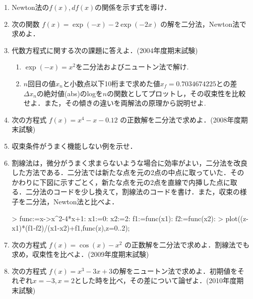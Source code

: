 \begin{enumerate}
\item Newton法の$f(x), df(x)$の関係を示す式を導け．
\item 次の関数 $f(x) = \exp(-x)-2\exp(-2x)$ の解を二分法，Newton法で求めよ．
\item 代数方程式に関する次の課題に答えよ．(2004年度期末試験)
\begin{enumerate}
\item $\exp(-x) = x^2$を二分法およびニュートン法で解け.
\item $n$回目の値$x_n$と小数点以下10桁まで求めた値$x_f=0.7034674225$との差$\Delta x_n$の絶対値(abs)のlogを$n$の関数としてプロットし，その収束性を比較せよ．また，その傾きの違いを両解法の原理から説明せよ.
\end{enumerate}
\item 次の方程式 $f(x) = x^4-x-0.12$ の正数解を二分法で求めよ．(2008年度期末試験)
\item 収束条件がうまく機能しない例を示せ．
\item 割線法は，微分がうまく求まらないような場合に効率がよい，二分法を改良した方法である．二分法では新たな点を元の2点の中点に取っていた．そのかわりに下図に示すごとく，新たな点を元の2点を直線で内挿した点に取る．二分法のコードを少し換えて，割線法のコードを書け．また，収束の様子を二分法，Newton法と比べよ．
\begin{MapleInput}
> func:=x->x^2-4*x+1: x1:=0: x2:=2: f1:=func(x1): f2:=func(x2):
> plot({(z-x1)*(f1-f2)/(x1-x2)+f1,func(z)},z=0..2);
\end{MapleInput}
\item 次の方程式 $f(x) = \cos(x)-x^2$ の正数解を二分法で求めよ．割線法でも求め，収束性を比べよ．(2009年度期末試験)
\item 次の方程式 $f(x)=x^3-3x+3$の解をニュートン法で求めよ．初期値をそれぞれ$x = -3, x = 2$とした時を比べ，その差について論ぜよ．(2010年度期末試験)
\end{enumerate}
